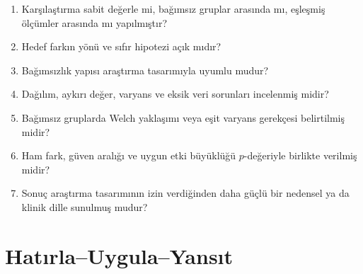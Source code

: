 \begin{enumerate}
  \item Karşılaştırma sabit değerle mi, bağımsız gruplar arasında mı, eşleşmiş ölçümler arasında mı yapılmıştır?
  \item Hedef farkın yönü ve sıfır hipotezi açık mıdır?
  \item Bağımsızlık yapısı araştırma tasarımıyla uyumlu mudur?
  \item Dağılım, aykırı değer, varyans ve eksik veri sorunları incelenmiş midir?
  \item Bağımsız gruplarda Welch yaklaşımı veya eşit varyans gerekçesi belirtilmiş midir?
  \item Ham fark, güven aralığı ve uygun etki büyüklüğü $p$-değeriyle birlikte verilmiş midir?
  \item Sonuç araştırma tasarımının izin verdiğinden daha güçlü bir nedensel ya da klinik dille sunulmuş mudur?
\end{enumerate}





\section*{Hatırla--Uygula--Yansıt}

